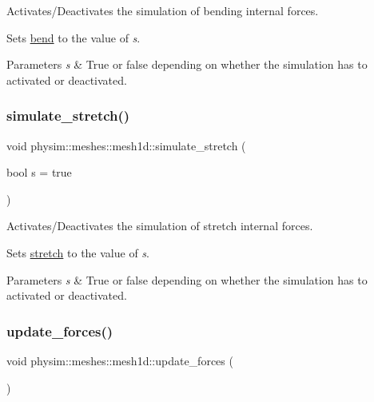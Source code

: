 Activates/\+Deactivates the simulation of bending internal forces. 

Sets \hyperlink{classphysim_1_1meshes_1_1mesh1d_a93d3f9fb656f309bf884333bafa9383e}{bend} to the value of {\itshape s}. 
\begin{DoxyParams}{Parameters}
{\em s} & True or false depending on whether the simulation has to activated or deactivated. \\
\hline
\end{DoxyParams}
\mbox{\label{classphysim_1_1meshes_1_1mesh1d_a7601dc6b7a0b59738bdf89c806fbd4ef}} 
\subsubsection{\texorpdfstring{simulate\+\_\+stretch()}{simulate\_stretch()}}
{\footnotesize\ttfamily void physim\+::meshes\+::mesh1d\+::simulate\+\_\+stretch (\begin{DoxyParamCaption}\item[{bool}]{s = {\ttfamily true} }\end{DoxyParamCaption})}



Activates/\+Deactivates the simulation of stretch internal forces. 

Sets \hyperlink{classphysim_1_1meshes_1_1mesh1d_a2c5233fc91df5ae5ac41759e4d8419da}{stretch} to the value of {\itshape s}. 
\begin{DoxyParams}{Parameters}
{\em s} & True or false depending on whether the simulation has to activated or deactivated. \\
\hline
\end{DoxyParams}
\mbox{\label{classphysim_1_1meshes_1_1mesh1d_abc53d477a2999654e09cabb0b5fd15ff}} 
\subsubsection{\texorpdfstring{update\+\_\+forces()}{update\_forces()}}
{\footnotesize\ttfamily void physim\+::meshes\+::mesh1d\+::update\+\_\+forces (\begin{DoxyParamCaption}{ }\end{DoxyParamCaption})\hspace{0.3cm}{\ttfamily [virtual]}}



